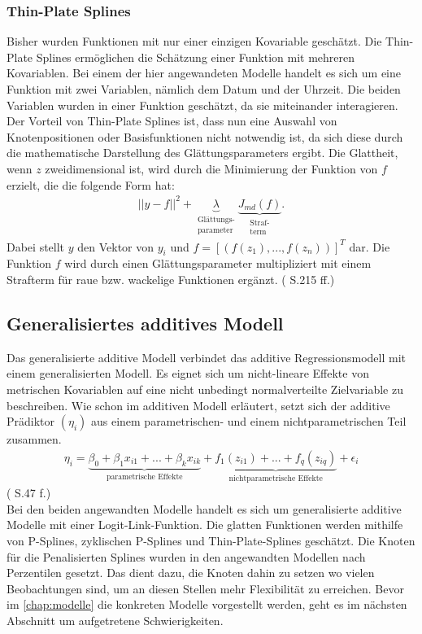 \documentclass[12pt]{scrreprt}
\begin{document}
\subsubsection{Thin-Plate Splines}
Bisher wurden Funktionen mit nur einer einzigen Kovariable geschätzt. Die Thin-Plate Splines ermöglichen die Schätzung einer Funktion mit mehreren Kovariablen. Bei einem der hier angewandeten Modelle handelt es sich um eine Funktion mit zwei Variablen, nämlich dem Datum und der Uhrzeit. Die beiden Variablen wurden in einer Funktion geschätzt, da sie miteinander interagieren. Der Vorteil von Thin-Plate Splines ist, dass nun eine Auswahl von Knotenpositionen oder Basisfunktionen nicht notwendig ist, da sich diese durch die mathematische Darstellung des Glättungsparameters ergibt. Die Glattheit, wenn $z$ zweidimensional ist, wird durch die Minimierung der Funktion von $f$ erzielt, die die folgende Form hat:
\begin{align}
||y-f||^2+\underbrace{\lambda}_{\substack{\text{Glättungs-} \\ \text{parameter}}} \underbrace{J_{md}(f)}_{\substack{\text{Straf-} \\ \text{term}}}.
\end{align}
Dabei stellt $y$ den Vektor von $y_{i}$ und $f=[(f(z_{1}),...,f(z_{n}))]^T$ dar. Die Funktion $f$ wird durch einen Glättungsparameter multipliziert mit einem Strafterm für raue bzw. wackelige Funktionen ergänzt. (\cite{wood2017generalized} S.215 ff.)

\subsection{Generalisiertes additives Modell}
Das generalisierte additive Modell verbindet das additive Regressionsmodell mit einem generalisierten Modell.
Es eignet sich um nicht-lineare Effekte von metrischen Kovariablen auf eine nicht unbedingt normalverteilte Zielvariable zu beschreiben. Wie schon im additiven Modell erläutert, setzt sich der additive Prädiktor $(\eta_{i})$ aus einem parametrischen- und einem nichtparametrischen Teil zusammen.
\begin{align}
\eta_{i}=\underbrace{\beta_{0}+\beta_{1}x_{i1}+...+\beta_{k}x_{ik}}_{\text{parametrische Effekte}}+ \underbrace{f_{1}(z_{i1})+...+f_{q}(z_{iq})}_{\text{nichtparametrische Effekte}}+\epsilon_{i}
\end{align}
(\cite{fahrmeir2007regression} S.47 f.) \\
Bei den beiden angewandten Modelle handelt es sich um generalisierte additive Modelle mit einer Logit-Link-Funktion. Die glatten Funktionen werden mithilfe von P-Splines, zyklischen P-Splines und Thin-Plate-Splines geschätzt. Die Knoten für die Penalisierten Splines wurden in den angewandten Modellen nach Perzentilen gesetzt. Das dient dazu, die Knoten dahin zu setzen wo vielen Beobachtungen sind, um an diesen Stellen mehr Flexibilität zu erreichen. Bevor im \autoref{chap:modelle} die konkreten Modelle vorgestellt werden, geht es im nächsten Abschnitt um aufgetretene Schwierigkeiten.
\end{document}

